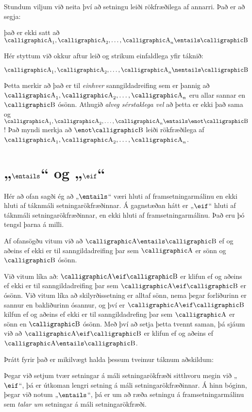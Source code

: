 Stundum viljum við neita því að setningu leiði rökfræðilega af annarri. Það er að segja:
\begin{center}
	það er ekki satt að $\meta{A}_1, \meta{A}_2, \ldots, \meta{A}_n \entails \meta{B}$
\end{center}
Hér styttum við okkur aftur leið og strikum einfaldlega yfir táknið:

$$\meta{A}_1, \meta{A}_2, \ldots, \meta{A}_n \nentails \meta{B}$$

Þetta merkir að það er til \emph{einhver} sanngildadreifing sem er þannig að $\meta{A}_1, \meta{A}_2, \ldots, \meta{A}_n$ eru allar sannar en $\meta{B}$ ósönn. Athugið \emph{alveg sérstaklega vel} að þetta er ekki það sama og $\meta{A}_1, \meta{A}_2, \ldots, \meta{A}_n \entails \enot \meta{B}$! Það myndi merkja að $\enot \meta{B}$ leiði rökfræðilega af $\meta{A}_1, \meta{A}_2, \ldots, \meta{A}_n$.

\section{„$\entails$“ og „$\eif$“}

Hér að ofan sagði ég að „$\entails$“ væri hluti af framsetningarmálinu en ekki hluti af táknmáli setningarökfræðinnar. Á gagnstæðan hátt er „$\eif$“ hluti af táknmáli setningarökfræðinnar, en ekki hluti af framsetningarmálinu. Það eru þó tengsl þarna á milli.

Af ofansögðu vitum við að $\meta{A} \entails \meta{B}$ ef og aðeins ef ekki er til sanngildadreifing þar sem $\meta{A}$ er sönn og $\meta{B}$ ósönn.

Við vitum líka að: $\meta{A} \eif \meta{B}$ er klifun ef og aðeins ef ekki er til sanngildadreifing þar sem $\meta{A} \eif \meta{B}$ er ósönn. Við vitum líka að skilyrðissetning er alltaf sönn, nema þegar forliðurinn er sannur en bakliðurinn ósannur, og því er $\meta{A} \eif \meta{B}$ kilfun ef og aðeins ef ekki er til sanngildadrefing þar sem $\meta{A}$ er sönn en $\meta{B}$ ósönn. Með því að setja þetta tvennt saman, þá sjáum við að $\meta{A} \eif \meta{B}$ er klifun ef og aðeins ef $\meta{A} \entails \meta{B}$. 

Þrátt fyrir það er mikilvægt halda þessum tveimur táknum aðskildum: 
	
Þegar við setjum tvær setningar á máli setningarökfræði sitthvoru megin við „$\eif$“, þá er útkoman lengri setning á máli setningarökfræðinnar. Á hinn bóginn, þegar við notum „$\entails$“, þá er um að ræða setningu á framsetningarmálinu sem \emph{talar um} setningar á máli setningarökfræði.

